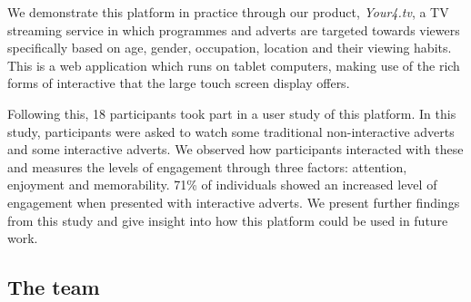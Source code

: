 We demonstrate this platform in practice through our product, \textit{Your4.tv}, a TV streaming service in which programmes and adverts are targeted towards viewers specifically based on age, gender, occupation, location and their viewing habits. This is a web application which runs on tablet computers, making use of the rich forms of interactive that the large touch screen display offers.

Following this, 18 participants took part in a user study of this platform. In this study, participants were asked to watch some traditional non-interactive adverts and some interactive adverts. We observed how participants interacted with these and measures the levels of engagement through three factors: attention, enjoyment and memorability. 71\% of individuals showed an increased level of engagement when presented with interactive adverts. We present further findings from this study and give insight into how this platform could be used in future work.




\subsection{The team}

